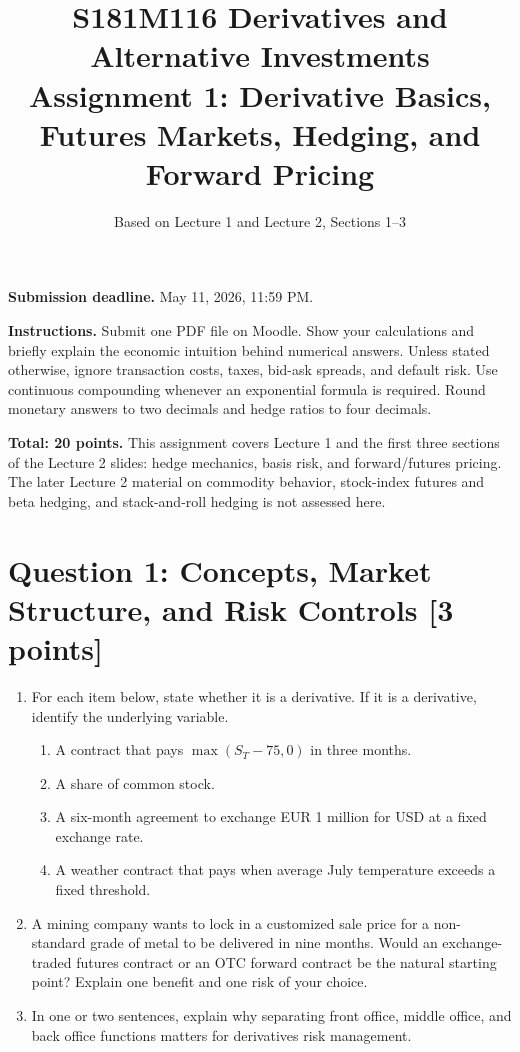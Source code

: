 \documentclass[11pt]{article}
\title{S181M116 Derivatives and Alternative Investments\\
Assignment 1: Derivative Basics, Futures Markets, Hedging, and Forward Pricing}
\author{Based on Lecture 1 and Lecture 2, Sections 1--3}
\date{}
\newcommand{\pts}[1]{\hspace{0.35em}\textnormal{\textbf{[#1 points]}}}
\newcommand{\St}{S_T}
\begin{document}
\maketitle

\textbf{Submission deadline.} May 11, 2026, 11:59 PM.

\textbf{Instructions.} Submit one PDF file on Moodle. Show your calculations and
briefly explain the economic intuition behind numerical answers. Unless stated
otherwise, ignore transaction costs, taxes, bid-ask spreads, and default risk.
Use continuous compounding whenever an exponential formula is required. Round
monetary answers to two decimals and hedge ratios to four decimals.

\textbf{Total: 20 points.} This assignment covers Lecture 1 and the first three
sections of the Lecture 2 slides: hedge mechanics, basis risk, and forward/futures
pricing. The later Lecture 2 material on commodity behavior, stock-index futures
and beta hedging, and stack-and-roll hedging is not assessed here.

\section*{Question 1: Concepts, Market Structure, and Risk Controls \pts{3}}

\begin{enumerate}
    \item For each item below, state whether it is a derivative. If it is a
    derivative, identify the underlying variable.
    \begin{enumerate}
        \item A contract that pays $\max(\St-75,0)$ in three months.
        \item A share of common stock.
        \item A six-month agreement to exchange EUR 1 million for USD at a fixed
        exchange rate.
        \item A weather contract that pays when average July temperature exceeds
        a fixed threshold.
    \end{enumerate}
    \item A mining company wants to lock in a customized sale price for a
    non-standard grade of metal to be delivered in nine months. Would an
    exchange-traded futures contract or an OTC forward contract be the natural
    starting point? Explain one benefit and one risk of your choice.
    \item In one or two sentences, explain why separating front office, middle
    office, and back office functions matters for derivatives risk management.
\end{enumerate}
\end{document}

